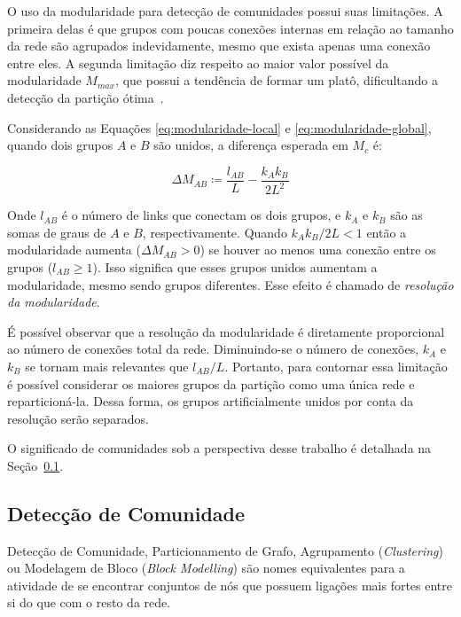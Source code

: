 \documentclass[12pt,a4paper]{article}
\theoremstyle{hypo}
\newcommand{\defn}{\coloneqq} %
\begin{document}
O uso da modularidade para detecção de comunidades possui suas limitações. A primeira delas é que grupos com poucas conexões internas em relação ao tamanho da rede são agrupados indevidamente, mesmo que exista apenas uma conexão entre eles. A segunda limitação diz respeito ao maior valor possível da modularidade $M_\textit{max}$, que possui a tendência de formar um platô, dificultando a detecção da partição ótima~\cite{Barabasi2016-rn}.

Considerando as Equações \ref{eq:modularidade-local} e \ref{eq:modularidade-global}, quando dois grupos $A$ e $B$ são unidos, a diferença esperada em $M_c$ é:

\begin{equation}
\Delta M_{AB} \defn \frac{l_{AB}}{L} - \frac{k_A k_B}{2L^2}
\end{equation}

Onde $l_{AB}$ é o número de links que conectam os dois grupos, e $k_A$ e $k_B$ são as somas de graus de $A$ e $B$, respectivamente. Quando $k_A k_B / 2L < 1$ então a modularidade aumenta ($\Delta M_{AB} > 0$) se houver ao menos uma conexão entre os grupos ($l_{AB} \geq 1$). Isso significa que esses grupos unidos aumentam a modularidade, mesmo sendo grupos diferentes. Esse efeito é chamado de \textit{resolução da modularidade}.

É possível observar que a resolução da modularidade é diretamente proporcional ao número de conexões total da rede. Diminuindo-se o número de conexões, $k_A$ e $k_B$ se tornam mais relevantes que $l_{AB} / L$. Portanto, para contornar essa limitação é possível considerar os maiores grupos da partição como uma única rede e reparticioná-la. Dessa forma, os grupos artificialmente unidos por conta da resolução serão separados.


O significado de comunidades sob a perspectiva desse trabalho é detalhada na Seção~\ref{sec:deteccao-comunidade}.

\subsection{Detecção de Comunidade} \label{sec:deteccao-comunidade}

Detecção de Comunidade, Particionamento de Grafo, Agrupamento (\textit{Clustering}) ou Modelagem de Bloco (\textit{Block Modelling}) são nomes equivalentes para a atividade de se encontrar conjuntos de nós que possuem ligações mais fortes entre si do que com o resto da rede.
\end{document}
